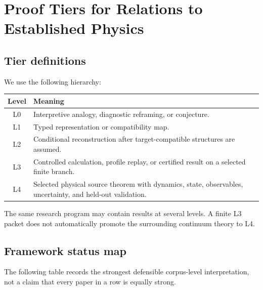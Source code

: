 \documentclass[11pt]{article}
\begin{document}
\section{Proof Tiers for Relations to Established Physics}

\subsection{Tier definitions}

We use the following hierarchy:
\begin{center}
\begin{tabular}{|c|p{10cm}|}
\hline
Level & Meaning \\ \hline
L0 & Interpretive analogy, diagnostic reframing, or conjecture. \\ \hline
L1 & Typed representation or compatibility map. \\ \hline
L2 & Conditional reconstruction after target-compatible structures are
assumed. \\ \hline
L3 & Controlled calculation, profile replay, or certified result on a selected
finite branch. \\ \hline
L4 & Selected physical source theorem with dynamics, state, observables,
uncertainty, and held-out validation. \\ \hline
\end{tabular}
\end{center}

\begin{remark}
The same research program may contain results at several levels.  A finite L3
packet does not automatically promote the surrounding continuum theory to L4.
\end{remark}

\subsection{Framework status map}

The following table records the strongest defensible corpus-level
interpretation, not a claim that every paper in a row is equally strong.
\end{document}
